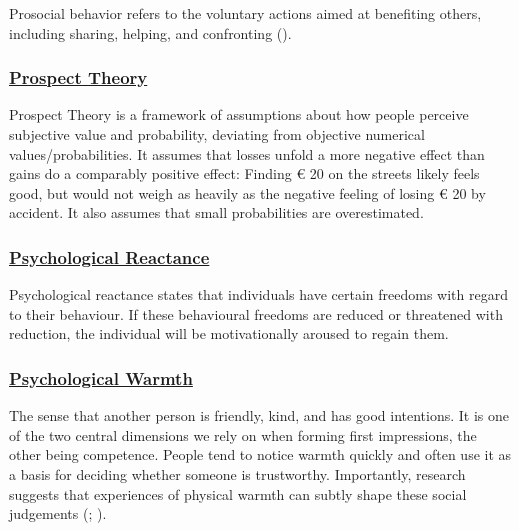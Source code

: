 \documentclass[
  letterpaper,
]{book}
\begin{document}
Prosocial behavior refers to the voluntary actions aimed at benefiting
others, including sharing, helping, and confronting
().

\subsubsection*{\texorpdfstring{\hyperref[def-prospecttheory]{Prospect
Theory}}{Prospect Theory}}\label{prospect-theory}

Prospect Theory is a framework of assumptions about how people perceive
subjective value and probability, deviating from objective numerical
values/probabilities. It assumes that losses unfold a more negative
effect than gains do a comparably positive effect: Finding € 20 on the
streets likely feels good, but would not weigh as heavily as the
negative feeling of losing € 20 by accident. It also assumes that small
probabilities are overestimated.

\subsubsection*{\texorpdfstring{\hyperref[def-psychologicalreactance]{Psychological
Reactance}}{Psychological Reactance}}\label{psychological-reactance}

Psychological reactance states that individuals have certain freedoms
with regard to their behaviour. If these behavioural freedoms are
reduced or threatened with reduction, the individual will be
motivationally aroused to regain them.

\subsubsection*{\texorpdfstring{\hyperref[def-psychologicalwarmth]{Psychological
Warmth}}{Psychological Warmth}}\label{psychological-warmth}

The sense that another person is friendly, kind, and has good
intentions. It is one of the two central dimensions we rely on when
forming first impressions, the other being competence. People tend to
notice warmth quickly and often use it as a basis for deciding whether
someone is trustworthy. Importantly, research suggests that experiences
of physical warmth can subtly shape these social judgements
(;
).
\end{document}
